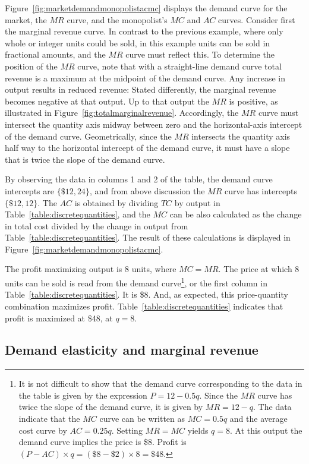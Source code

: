 Figure~\ref{fig:marketdemandmonopolistacmc} displays the demand curve for the market, the $MR$ curve, and
the monopolist's $MC$ and $AC$ curves. Consider first the marginal revenue
curve. In contrast to the previous example, where only whole or integer
units could be sold, in this example units can be sold in fractional
amounts, and the $MR$ curve must reflect this. To determine the position of
the $MR$ curve, note that with a straight-line demand curve total revenue is
a maximum at the midpoint of the demand curve. Any increase in output
results in reduced revenue: Stated differently, the marginal revenue becomes
negative at that output. Up to that output the $MR$ is positive, as
illustrated in Figure~\ref{fig:totalmarginalrevenue}. Accordingly, the $MR$ curve must intersect the
quantity axis midway between zero and the horizontal-axis intercept of the
demand curve. Geometrically, since the $MR$ intersects the quantity axis
half way to the horizontal intercept of the demand curve, it must have a
slope that is twice the slope of the demand curve.

By observing the data in columns 1 and 2 of the table, the demand curve 
intercepts are $\{\$12,24\}$, and from above discussion the $MR$ curve 
has intercepts $\{\$12,12\}$. The $AC$ is obtained by dividing $TC$ by 
output in Table~\ref{table:discretequantities}, and the $MC$ can be also 
calculated as the change in total cost divided by the change in output 
from Table~\ref{table:discretequantities}. The result of these calculations 
is displayed in Figure~\ref{fig:marketdemandmonopolistacmc}.

The profit maximizing output is 8 units, where $MC=MR$. The price at which 
8 units can be sold is read from the demand curve\footnote{It is not difficult 
	to show that the demand curve corresponding to the data in the table is 
	given by the expression $P=12-0.5q$. Since the $MR$ curve has twice the 
	slope of the demand curve, it is given by $MR=12-q$. The data indicate 
	that the $MC$ curve can be written as $MC=0.5q$ and the average cost curve 
	by $AC=0.25q$. Setting $MR=MC$ yields $q=8$. At this output the demand 
	curve implies the price is \$8. Profit is $(P-AC)\times q=(\$8-\$2)\times 8=\$48$.}, 
or the first column in Table~\ref{table:discretequantities}. It is \$8. And, 
as expected, this price-quantity combination maximizes profit. 
Table~\ref{table:discretequantities} indicates that profit is maximized at \$48, at $q=8$.

\newhtmlpage

\subsection*{Demand elasticity and marginal revenue}

